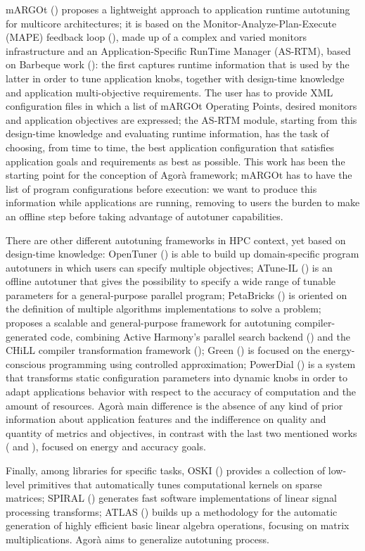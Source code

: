 mARGOt (\cite{gadioli2015application}) proposes a lightweight approach to application runtime autotuning for multicore architectures; it is based on the Monitor-Analyze-Plan-Execute (MAPE) feedback loop (\cite{kephart2003vision}), made up of a complex and varied monitors infrastructure and an Application-Specific RunTime Manager (AS-RTM), based on Barbeque work (\cite{bellasi2012rtrm}): the first captures runtime information that is used by the latter in order to tune application knobs, together with design-time knowledge and application multi-objective requirements. The user has to provide XML configuration files in which a list of mARGOt Operating Points, desired monitors and application objectives are expressed; the AS-RTM module, starting from this design-time knowledge and evaluating runtime information, has the task of choosing, from time to time, the best application configuration that satisfies application goals and requirements as best as possible. This work has been the starting point for the conception of Agorà framework; mARGOt has to have the list of program configurations before execution: we want to produce this information while applications are running, removing to users the burden to make an offline step before taking advantage of autotuner capabilities.

There are other different autotuning frameworks in HPC context, yet based on design-time knowledge: OpenTuner (\cite{ansel2014opentuner}) is able to build up domain-specific program autotuners in which users can specify multiple objectives; ATune-IL (\cite{schaefer2009atune}) is an offline autotuner that gives the possibility to specify a wide range of tunable parameters for a general-purpose parallel program; PetaBricks (\cite{ansel2009petabricks}) is oriented on the definition of multiple algorithms implementations to solve a problem; \cite{tiwari2009scalable} proposes a scalable and general-purpose framework for autotuning compiler-generated code, combining Active Harmony's parallel search backend (\cite{chung2004using}) and the CHiLL compiler transformation framework (\cite{chen2008chill}); Green (\cite{baek2010green}) is focused on the energy-conscious programming using controlled approximation; PowerDial (\cite{hoffmann2011dynamic}) is a system that transforms static configuration parameters into dynamic knobs in order to adapt applications behavior with respect to the accuracy of computation and the amount of resources. Agorà main difference is the absence of any kind of prior information about application features and the indifference on quality and quantity of metrics and objectives, in contrast with the last two mentioned works (\cite{baek2010green} and \cite{hoffmann2011dynamic}), focused on energy and accuracy goals.

Finally, among libraries for specific tasks, OSKI (\cite{vuduc2005oski}) provides a collection of low-level primitives that automatically tunes computational kernels on sparse matrices; SPIRAL (\cite{puschel2004spiral}) generates fast software implementations of linear signal processing transforms; ATLAS (\cite{whaley1998automatically}) builds up a methodology for the automatic generation of highly efficient basic linear algebra operations, focusing on matrix multiplications. Agorà aims to generalize autotuning process.
